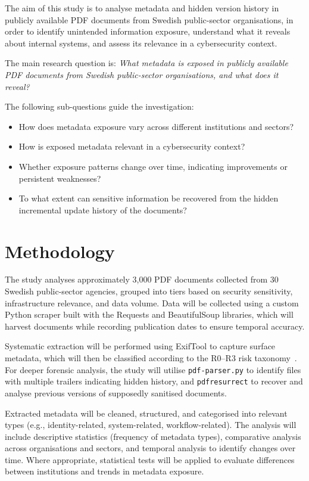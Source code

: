 \documentclass[conference]{IEEEtran}
\begin{document}
The aim of this study is to analyse metadata and hidden version history in publicly available PDF documents from Swedish public-sector organisations, in order to identify unintended information exposure, understand what it reveals about internal systems, and assess its relevance in a cybersecurity context.

The main research question is: \textit{What metadata is exposed in publicly available PDF documents from Swedish public-sector organisations, and what does it reveal?}

The following sub-questions guide the investigation:
\begin{itemize}
    \item How does metadata exposure vary across different institutions and sectors?
    \item How is exposed metadata relevant in a cybersecurity context?
    \item Whether exposure patterns change over time, indicating improvements or persistent weaknesses?
    \item To what extent can sensitive information be recovered from the hidden incremental update history of the documents?
\end{itemize}

\section{Methodology}

The study analyses approximately 3,000 PDF documents collected from 30 Swedish public-sector agencies, grouped into tiers based on security sensitivity, infrastructure relevance, and data volume. Data will be collected using a custom Python scraper built with the Requests and BeautifulSoup libraries, which will harvest documents while recording publication dates to ensure temporal accuracy.

Systematic extraction will be performed using ExifTool to capture surface metadata, which will then be classified according to the R0--R3 risk taxonomy~\cite{b4}. For deeper forensic analysis, the study will utilise \texttt{pdf-parser.py} to identify files with multiple trailers indicating hidden history, and \texttt{pdfresurrect} to recover and analyse previous versions of supposedly sanitised documents.

Extracted metadata will be cleaned, structured, and categorised into relevant types (e.g., identity-related, system-related, workflow-related). The analysis will include descriptive statistics (frequency of metadata types), comparative analysis across organisations and sectors, and temporal analysis to identify changes over time. Where appropriate, statistical tests will be applied to evaluate differences between institutions and trends in metadata exposure.
\end{document}
